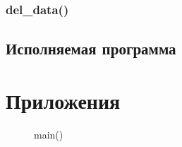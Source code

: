 \documentclass[12pt, a4paper]{article}
\begin{document}
\subsubsection{del\_data()}




\subsection{Исполняемая программа}

\labconclusion{}

\newpage

\section{Приложения}

\begin{figure}[h]
    \caption{main()}
    \label{fig:main}
\end{figure}
\end{document}
